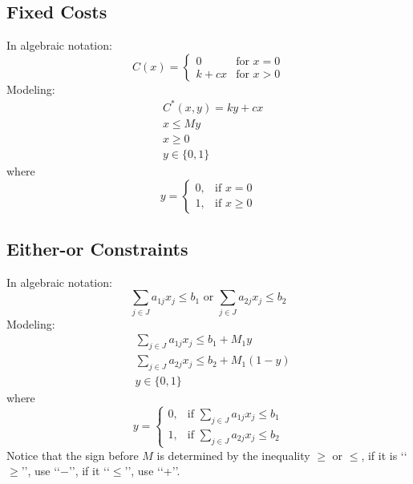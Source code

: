 				\subsection{Fixed Costs}
					In algebraic notation: 
					\begin{equation}
						C(x) = \begin{cases} 0 & \text{for } x=0 \\ k + cx & \text{for } x > 0 \end{cases} 
					\end{equation}
					Modeling:
					\begin{align}
						& C^*(x, y) = ky+cx\\
						& x \le My  \\
						& x \ge 0 \\
						& y \in \{0, 1\} 
					\end{align}
					where
					\begin{equation}y=\begin{cases}0, & \text{if }x=0 \\ 1, & \text{if }x\ge 0\end{cases} \end{equation}

				\subsection{Either-or Constraints}
					In algebraic notation: 
					\begin{equation}
						\sum_{j\in J} a_{1j} x_j \le b_1 \text{ or } \sum_{j\in J} a_{2j} x_j \le b_2 
					\end{equation}
					Modeling:
					\begin{align}
						& \sum_{j\in J} a_{1j} x_j \le b_1 + M_1y  \\
						& \sum_{j\in J} a_{2j} x_j \le b_2 + M_1(1-y)  \\
						& y \in \{0, 1\} 
					\end{align}
					where
					\begin{equation}y=\begin{cases}0, & \text{if }\sum_{j\in J} a_{1j} x_j \le b_1 \\ 1, & \text{if } \sum_{j\in J} a_{2j} x_j \le b_2\end{cases} \end{equation}
					Notice that the sign before $M$ is determined by the inequality $\ge$ or $\le$, if it is \lq\lq{}$\ge$\rq\rq{}, use \lq\lq{}$-$\rq\rq{}, if it \lq\lq{}$\le$\rq\rq{}, use \lq\lq{}+\rq\rq{}.


